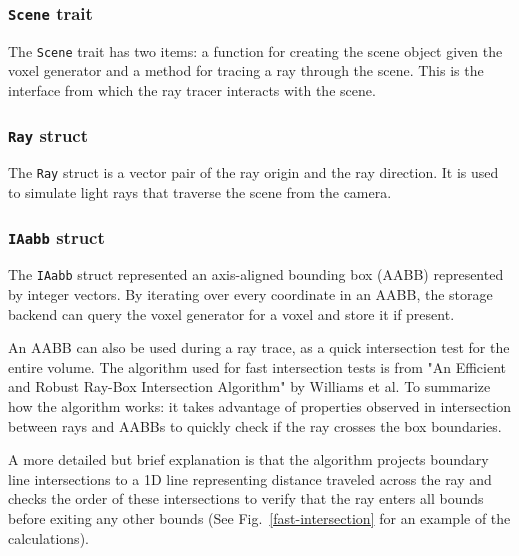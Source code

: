 \documentclass[conference]{IEEEtran}
\begin{document}
\cprotect\subsubsection{\verb|Scene| trait}

The \verb|Scene| trait has two items: a function for creating the scene object given the voxel generator and a method for tracing a ray through the scene.
This is the interface from which the ray tracer interacts with the scene.

\cprotect\subsubsection{\verb|Ray| struct}

The \verb|Ray| struct is a vector pair of the ray origin and the ray direction.
It is used to simulate light rays that traverse the scene from the camera.

\cprotect\subsubsection{\verb|IAabb| struct}

The \verb|IAabb| struct represented an axis-aligned bounding box (AABB) represented by integer vectors.
By iterating over every coordinate in an AABB, the storage backend can query the voxel generator for a voxel and store it if present.

An AABB can also be used during a ray trace, as a quick intersection test for the entire volume.
The algorithm used for fast intersection tests is from "An Efficient and Robust Ray-Box Intersection Algorithm" by Williams et al. \cite{williams}
To summarize how the algorithm works: it takes advantage of properties observed in intersection between rays and AABBs to quickly check if the ray crosses the box boundaries.

A more detailed but brief explanation is that the algorithm projects boundary line intersections to a 1D line representing distance traveled across the ray and checks the order of these intersections to verify that the ray enters all bounds before exiting any other bounds (See Fig.~\ref{fast-intersection} for an example of the calculations).
\end{document}
